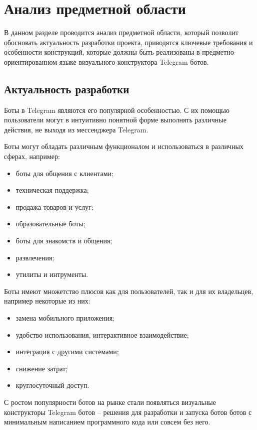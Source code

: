 
\section{Анализ предметной области}

В данном разделе проводится анализ предметной области,
который позволит обосновать актуальность разработки проекта,
приводятся ключевые требования и особенности конструкций,
которые должны быть реализованы в предметно-ориентированном языке визуального конструктора Telegram ботов.

\subsection{Актуальность разработки}

Боты в Telegram являются его популярной особенностью.
С их помощью пользователи могут в интуитивно понятной форме выполнять различные действия, не выходя из мессенджера Telegram.

Боты могут обладать различным функционалом и использоваться в различных сферах, например:
\begin{itemize}
    \item боты для общения с клиентами;
    \item техническая поддержка;
    \item продажа товаров и услуг;
    \item образовательные боты;
    \item боты для знакомств и общения;
    \item развлечения;
    \item утилиты и интрументы.
\end{itemize}

Боты имеют множетство плюсов как для пользователей, так и для их владельцев, например некоторые из них:
\begin{itemize}
    \item замена мобильного приложения;
    \item удобство использования, интерактивное взаимодействие;
    \item интеграция с другими системами;
    \item снижение затрат;
    \item круглосуточный доступ.
\end{itemize}

С ростом популярности ботов на рынке стали появляться визуальные конструкторы Telegram ботов --
решения для разработки и запуска ботов ботов с минимальным написанием программного кода или совсем без него. 

